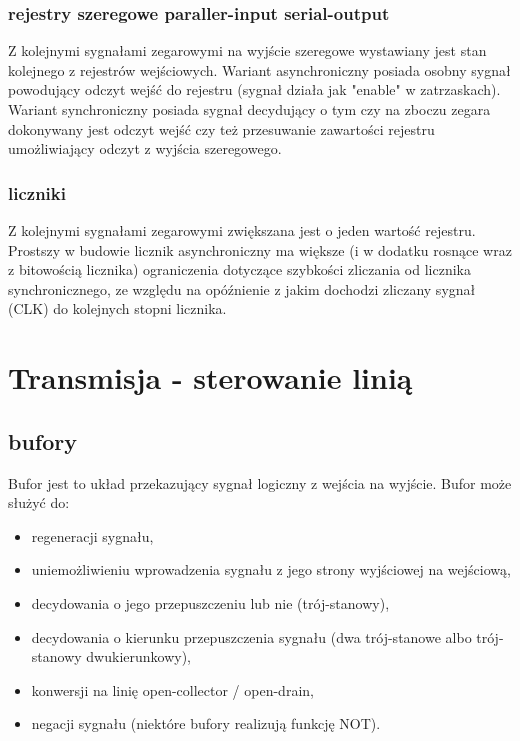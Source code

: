 \documentclass{pdfBooklets}
\begin{document}
\subsubsection{rejestry szeregowe paraller-input serial-output}
Z kolejnymi sygnałami zegarowymi na wyjście szeregowe wystawiany jest stan kolejnego z rejestrów wejściowych. Wariant asynchroniczny posiada osobny sygnał powodujący odczyt wejść do rejestru (sygnał działa jak "enable" w zatrzaskach). Wariant synchroniczny posiada sygnał decydujący o tym czy na zboczu zegara dokonywany jest odczyt wejść czy też przesuwanie zawartości rejestru umożliwiający odczyt z wyjścia szeregowego.
\subsubsection{liczniki}
Z kolejnymi sygnałami zegarowymi zwiększana jest o jeden wartość rejestru. Prostszy w budowie licznik asynchroniczny ma większe (i w dodatku rosnące wraz z bitowością licznika) ograniczenia dotyczące szybkości zliczania od licznika synchronicznego, ze względu na opóźnienie z jakim dochodzi zliczany sygnał (CLK) do kolejnych stopni licznika.


\section{Transmisja - sterowanie linią}
\subsection{bufory}

Bufor jest to układ przekazujący sygnał logiczny z wejścia na wyjście. Bufor może służyć do:
\begin{itemize}
\item regeneracji sygnału,
\item uniemożliwieniu wprowadzenia sygnału z jego strony wyjściowej na wejściową,
\item decydowania o jego przepuszczeniu lub nie (trój-stanowy),
\item decydowania o kierunku przepuszczenia sygnału (dwa trój-stanowe albo trój-stanowy dwukierunkowy),
\item konwersji na linię open-collector / open-drain,
\item negacji sygnału (niektóre bufory realizują funkcję NOT).
\end{itemize}
\end{document}
